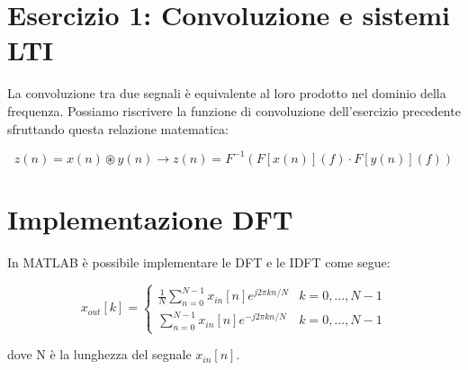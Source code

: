
\section{Esercizio 1: Convoluzione e sistemi LTI}
La convoluzione tra due segnali è equivalente al loro prodotto nel dominio 
della frequenza. Possiamo riscrivere la funzione di convoluzione dell'esercizio
precedente sfruttando questa relazione matematica:

\begin{equation}
	z(n) = x(n) \circledast y(n) \rightarrow 
	z(n) = F^{-1}(F[x(n)](f) \cdot F[y(n)](f))	
\end{equation}


\section{Implementazione DFT}
In MATLAB è possibile implementare le DFT e le IDFT come segue:

		
\begin{equation}
	x_{out}[k] = \begin{cases} 
	
	\frac{1}{N} \sum^{N-1}_{n=0} x_{in}[n] 
	e^{j 2 \pi k n / N } & k=0,...,N-1 \\ 
	
	\sum^{N-1}_{n=0} x_{in}[n] 
	e^{- j 2 \pi k n / N } & k=0,...,N-1 
	
	\end{cases}
\end{equation}

dove N è la lunghezza del segnale $x_{in}[n]$.


